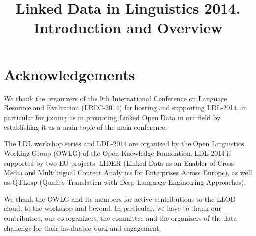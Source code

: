 \documentclass[10pt, a4paper]{article}
\title{Linked Data in Linguistics 2014. Introduction and Overview}
\begin{document}
\maketitleabstract





\section*{Acknowledgements}

We thank the organizers of the 9th International Conference on Language Resource and Evaluation (LREC-2014) for hosting and supporting LDL-2014, in particular for joining us in promoting Linked Open Data in our field by establishing it as a main topic of the main conference.

The LDL workshop series and LDL-2014 are organized by the Open Linguistics Working Group (OWLG) of the Open Knowledge Foundation. LDL-2014 is supported by two EU projects, LIDER (Linked Data as an Enabler of Cross-Media and Multilingual Content Analytics for Enterprises Across Europe), as well as QTLeap (Quality Translation with Deep Language Engineering Approaches).

We thank the OWLG and its members for active contributions to the LLOD cloud, to the workshop and beyond. In particular, we have to thank our contributors, our co-organizers, the committee and the organizers of the data challenge for their invaluable work and engagement.




\newpage
\end{document}
